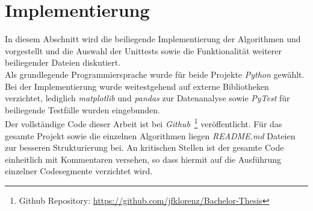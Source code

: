 \section{Implementierung}	%

\noindent
In diesem Abschnitt wird die beiliegende Implementierung der Algorithmen \Rm und \RM vorgestellt und die Auswahl der Unittests sowie die Funktionalität weiterer beiliegender Dateien diskutiert.\\[.1cm]
Als grundlegende Programmiersprache wurde für beide Projekte \textit{Python} gewählt. Bei der Implementierung wurde weitestgehend auf externe Bibliotheken verzichtet, lediglich \textit{matplotlib} und \textit{pandas} zur Datenanalyse sowie \textit{PyTest} für beiliegende Testfälle wurden eingebunden.\\[.05cm]
Der vollständige Code dieser Arbeit ist bei \textit{Github}~\footnote{Github Repository: \href{https://github.com/jfklorenz/Bachelor-Thesis}{https://github.com/jfklorenz/Bachelor-Thesis}} veröffentlicht.  Für das gesamte Projekt sowie die einzelnen Algorithmen liegen \textit{README.md} Dateien zur besseren Strukturierung bei. An kritischen Stellen ist der gesamte Code einheitlich mit Kommentaren versehen, so dass hiermit auf die Ausführung einzelner Codesegmente verzichtet wird. 

